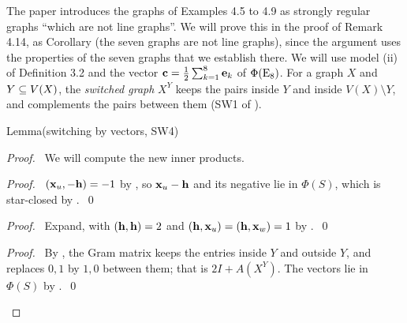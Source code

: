 The paper introduces the graphs of Examples 4.5 to 4.9 as strongly regular graphs ``which are
not line graphs''. We will prove this in the proof of Remark 4.14, as Corollary (the seven
graphs are not line graphs), since the argument uses the properties of the seven graphs that we
establish there.
We will use model (ii) of Definition 3.2 and the vector
${\mathbf c}=\frac12\sum_{k=1}^8{\mathbf e}_k$ of $\Phi(\mathrm{E}_8)$. For a graph $X$ and $Y\subseteq V(X)$, the
\emph{switched graph} $X^Y$ keeps the pairs inside $Y$ and inside $V(X)\setminus Y$, and
complements the pairs between them (SW1 of ).

\begin{namedresult}{Lemma}{(switching by vectors, SW4)}\label{lem:4-switch}
\end{namedresult}
\begin{proof}
 \pfsketch\ We will compute the new inner products.
 \begin{proof}\pf\ $({\mathbf x}_u,-{\mathbf h})=-1$ by , so ${\mathbf x}_u-{\mathbf h}$ and its negative lie in
  $\Phi(S)$, which is star-closed by .~\qed\end{proof}
 \begin{proof}\pf\ Expand, with $({\mathbf h},{\mathbf h})=2$ and $({\mathbf h},{\mathbf x}_u)=({\mathbf h},{\mathbf x}_w)=1$ by
  .~\qed\end{proof}
 \qedstep
 \begin{proof}\pf\ By , the Gram matrix keeps the entries inside $Y$ and outside
  $Y$, and replaces $0,1$ by $1,0$ between them; that is $2I+A(X^Y)$. The vectors lie in $\Phi(S)$
  by .~\qed\end{proof}
\end{proof}


